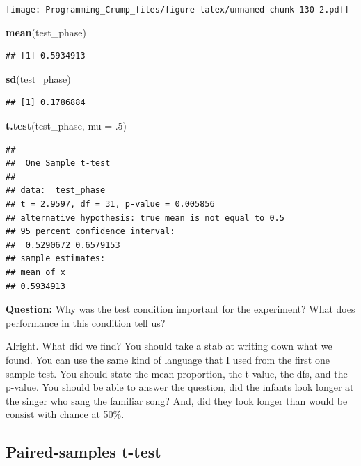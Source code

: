 \documentclass[]{book}
\newenvironment{Shaded}{\begin{snugshade}}{\end{snugshade}}
\newcommand{\KeywordTok}[1]{\textcolor[rgb]{0.13,0.29,0.53}{\textbf{{#1}}}}
\newcommand{\DataTypeTok}[1]{\textcolor[rgb]{0.13,0.29,0.53}{{#1}}}
\newcommand{\DecValTok}[1]{\textcolor[rgb]{0.00,0.00,0.81}{{#1}}}
\newcommand{\NormalTok}[1]{{#1}}
\theoremstyle{definition}
\theoremstyle{definition}
\theoremstyle{definition}
\theoremstyle{remark}
\begin{document}
\texttt{[image: Programming\_Crump\_files/figure-latex/unnamed-chunk-130-2.pdf]}

\begin{Shaded}
\begin{Highlighting}[]
\KeywordTok{mean}\NormalTok{(test_phase)}
\end{Highlighting}
\end{Shaded}

\begin{verbatim}
## [1] 0.5934913
\end{verbatim}

\begin{Shaded}
\begin{Highlighting}[]
\KeywordTok{sd}\NormalTok{(test_phase)}
\end{Highlighting}
\end{Shaded}

\begin{verbatim}
## [1] 0.1786884
\end{verbatim}

\begin{Shaded}
\begin{Highlighting}[]
\KeywordTok{t.test}\NormalTok{(test_phase, }\DataTypeTok{mu =} \NormalTok{.}\DecValTok{5}\NormalTok{)}
\end{Highlighting}
\end{Shaded}

\begin{verbatim}
## 
##  One Sample t-test
## 
## data:  test_phase
## t = 2.9597, df = 31, p-value = 0.005856
## alternative hypothesis: true mean is not equal to 0.5
## 95 percent confidence interval:
##  0.5290672 0.6579153
## sample estimates:
## mean of x 
## 0.5934913
\end{verbatim}

\textbf{Question:} Why was the test condition important for the
experiment? What does performance in this condition tell us?

Alright. What did we find? You should take a stab at writing down what
we found. You can use the same kind of language that I used from the
first one sample-test. You should state the mean proportion, the
t-value, the dfs, and the p-value. You should be able to answer the
question, did the infants look longer at the singer who sang the
familiar song? And, did they look longer than would be consist with
chance at 50\%.

\subsection{Paired-samples t-test}\label{paired-samples-t-test}
\end{document}
